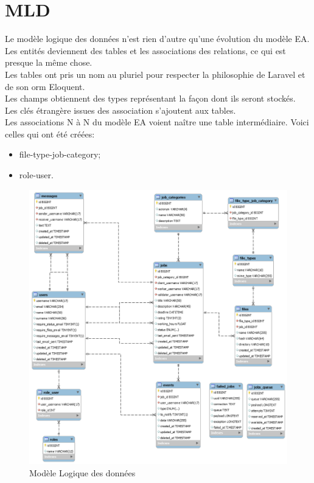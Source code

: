 \documentclass[
    iai, %
    il, %
]{heig-tb}
\begin{document}
\section{MLD}
Le modèle logique des données n'est rien d'autre qu'une évolution du modèle EA.\\
Les entités deviennent des tables et les associations des relations, ce qui est presque la même chose.\\
Les tables ont pris un nom au pluriel pour respecter la philosophie de Laravel et de son \Gls{orm} Eloquent.\\
Les champs obtiennent des types représentant la façon dont ils seront stockés.\\
Les clés étrangère issues des association s'ajoutent aux tables.\\
Les associations N à N du modèle EA voient naître une table intermédiaire. Voici celles qui ont été créées:
\begin{itemize}
    \item file-type-job-category;
    \item role-user.
\end{itemize}

\begin{center}
    \begin{figure}
        \includegraphics[width=\textwidth]{./assets/figures/mld.png}
        \caption{Modèle Logique des données \label{mld}}
    \end{figure}
\end{center}
\end{document}
